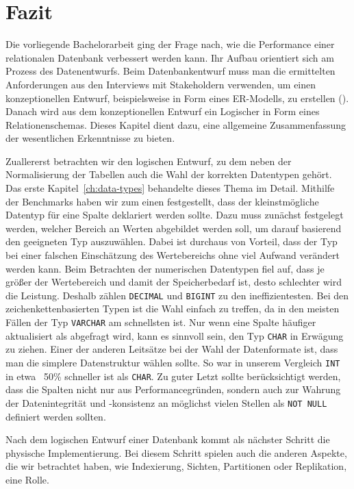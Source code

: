 \chapter{Fazit}\label{ch:fazit}

Die vorliegende Bachelorarbeit ging der Frage nach, wie die Performance einer relationalen Datenbank verbessert werden kann.
Ihr Aufbau orientiert sich am Prozess des Datenentwurfs.
Beim Datenbankentwurf muss man die ermittelten Anforderungen aus den Interviews mit Stakeholdern verwenden, um einen konzeptionellen Entwurf, beispielsweise in Form eines ER-Modells, zu erstellen (\cite{db_entwurf_erklaerung}).
Danach wird aus dem konzeptionellen Entwurf ein Logischer in Form eines Relationenschemas.
Dieses Kapitel dient dazu, eine allgemeine Zusammenfassung der wesentlichen Erkenntnisse zu bieten.

Zuallererst betrachten wir den logischen Entwurf, zu dem neben der Normalisierung der Tabellen auch die Wahl der korrekten Datentypen gehört.
Das erste Kapitel~\ref{ch:data-types} behandelte dieses Thema im Detail.
Mithilfe der Benchmarks haben wir zum einen festgestellt, dass der kleinstmögliche Datentyp für eine Spalte deklariert werden sollte.
Dazu muss zunächst festgelegt werden, welcher Bereich an Werten abgebildet werden soll, um darauf basierend den geeigneten Typ auszuwählen.
Dabei ist durchaus von Vorteil, dass der Typ bei einer falschen Einschätzung des Wertebereichs ohne viel Aufwand verändert werden kann.
Beim Betrachten der numerischen Datentypen fiel auf, dass je größer der Wertebereich und damit der Speicherbedarf ist, desto schlechter wird die Leistung.
Deshalb zählen \texttt{DECIMAL} und \texttt{BIGINT} zu den ineffizientesten.
Bei den zeichenkettenbasierten Typen ist die Wahl einfach zu treffen, da in den meisten Fällen der Typ \texttt{VARCHAR} am schnellsten ist.
Nur wenn eine Spalte häufiger aktualisiert als abgefragt wird, kann es sinnvoll sein, den Typ \texttt{CHAR} in Erwägung zu ziehen.
Einer der anderen Leitsätze bei der Wahl der Datenformate ist, dass man die simplere Datenstruktur wählen sollte.
So war in unserem Vergleich \texttt{INT} in etwa ~50\% schneller ist als \texttt{CHAR}.
Zu guter Letzt sollte berücksichtigt werden, dass die Spalten nicht nur aus Performancegründen, sondern auch zur Wahrung der Datenintegrität und -konsistenz an möglichst vielen Stellen als \texttt{NOT NULL} definiert werden sollten.

Nach dem logischen Entwurf einer Datenbank kommt als nächster Schritt die physische Implementierung.
Bei diesem Schritt spielen auch die anderen Aspekte, die wir betrachtet haben, wie Indexierung, Sichten, Partitionen oder Replikation, eine Rolle.

